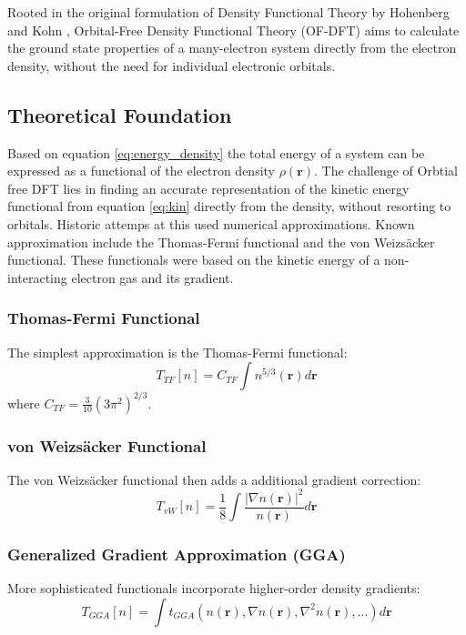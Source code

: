 Rooted in the original formulation of Density Functional Theory by Hohenberg and Kohn \cite{HohenbergKohn1964}, Orbital-Free Density Functional Theory (OF-DFT) aims to calculate the ground state properties of a many-electron system directly from the electron density, without the need for individual electronic orbitals.
\subsection{Theoretical Foundation}

Based on equation \eqref{eq:energy_density} the total energy of a system can be expressed as a functional of the electron density $\rho(\mathbf{r})$. The challenge of Orbtial free DFT lies in finding an accurate representation of the kinetic energy functional from equation \eqref{eq:kin} directly from the density, without resorting to orbitals. Historic attemps\cite{thakkar1992comparison,wang1999orbital} at this used numerical approximations. Known approximation include the Thomas-Fermi functional\cite{thomas_fermi_1927} and the von Weizsäcker functional\cite{von_weizsacker_1935}. These functionals were based on the kinetic energy of a non-interacting electron gas and its gradient.
\subsubsection{Thomas-Fermi Functional}
The simplest approximation is the Thomas-Fermi functional:
\begin{equation}
T_{TF}[n] = C_{TF} \int n^{5/3}(\mathbf{r}) d\mathbf{r}
\end{equation}
where $C_{TF} = \frac{3}{10}(3\pi^2)^{2/3}$.
\subsubsection{von Weizsäcker Functional}
The von Weizsäcker functional then adds a additional gradient correction:
\begin{equation}
T_{vW}[n] = \frac{1}{8} \int \frac{|\nabla n(\mathbf{r})|^2}{n(\mathbf{r})} d\mathbf{r}
\end{equation}
\subsubsection{Generalized Gradient Approximation (GGA)}
More sophisticated functionals incorporate higher-order density gradients:
\begin{equation}
T_{GGA}[n] = \int t_{GGA}(n(\mathbf{r}), \nabla n(\mathbf{r}), \nabla^2 n(\mathbf{r}), ...) d\mathbf{r}
\end{equation}

